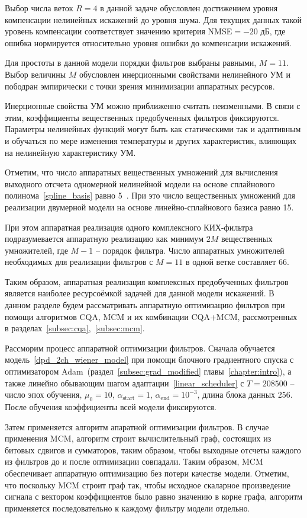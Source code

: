 Выбор числа веток $R=4$ в данной задаче обусловлен достижением уровня компенсации нелинейных искажений до уровня шума. Для текущих данных такой уровень компенсации соответствует значению критерия NMSE$=-20$ дБ, где ошибка нормируется относительно уровня ошибки до компенсации искажений.

Для простоты в данной модели порядки фильтров выбраны равными, $M=11$. Выбор величины $M$ обусловлен инерционными свойствами нелинейного УМ и пободран эмпирически с точки зрения минимизации аппаратных ресурсов.

Инерционные свойства УМ можно приближенно считать неизменными. В связи с этим, коэффициенты вещественных предобученных фильтров фиксируются. Параметры нелинейных функций могут быть как статическими так и адаптивным и обучаться по мере изменения температуры и других характеристик, влияющих на нелинейную характеристику УМ.

Отметим, что число аппаратных вещественных умножений для вычисления выходного отсчета одномерной нелинейной модели на основе сплайнового полинома~\eqref{spline_basis} равно 5~\cite{kamaraj2024secured}. При это число вещественных умножений для реализации двумерной модели на основе линейно-сплайнового базиса равно 15.

При этом аппаратная реализация одного комплексного КИХ-фильтра подразумевается аппаратную реализацию как минимум $2M$ вещественных умножителей, где $M-1$ -- порядок фильтра. Число аппаратных умножителей необходимых для реализации фильтров с $M=11$ в одной ветке составляет 66. 

Таким образом, аппаратная реализация комплексных предобученных фильтров является наиболее ресурсоёмкой задачей для данной модели искажений. В данном разделе будем рассматривать аппаратную оптимизацию фильтров при помощи алгоритмов CQA, MCM и их комбинации CQA+MCM, рассмотренных в разделах~\ref{subsec:cqa},~\ref{subsec:mcm}.

Рассморим процесс аппаратной оптимизации фильтров. Сначала обучается модель~\eqref{dpd_2ch_wiener_model} при помощи блочного градиентного спуска с оптимизатором Adam~(раздел~\ref{subsec:grad_modified} главы~\ref{chapter:intro}), а также линейно обывающим шагом адаптации~\eqref{linear_scheduler} с $T=208500$ -- число эпох обучения, $\mu_0=10$, $\alpha_{\text{start}}=1$, $\alpha_{\text{end}}=10^{-3}$, длина блока данных 256. После обучения коэффициенты всей модели фиксируются.

Затем применяется алгоритм апаратной оптимизации фильтров. В случае применения MCM, алгоритм строит вычислительный граф, состоящих из битовых сдвигов и сумматоров, таким образом, чтобы выходные отсчеты каждого из фильтров до и после оптимизации совпадали. Таким образом, MCM обеспечивает аппаратную оптимизацию без потери качестве модели. Отметим, что поскольку MCM строит граф так, чтобы исходное скаларное произведение сигнала с вектором коэффициентов было равно значению в корне графа, алгоритм применяется последовательно к каждому фильтру модели отдельно.

